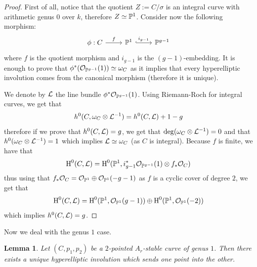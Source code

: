 \documentclass{alggeom}
\numberwithin{equation}{section}
\numberwithin{subsection}{section}
\newtheorem{lemma}[theorem]{Lemma}
\theoremstyle{definition}
\theoremstyle{remark}
\newcommand\cO{\mathcal{O}} \newcommand\cP{\mathcal{P}}
\renewcommand\H{\operatorname{H}}
\begin{document}
\begin{proof}
First of all, notice that the quotient $Z:=C/\sigma$ is an integral curve with arithmetic genus $0$ over $k$, therefore $Z\simeq \mathbb{P}^1$. Consider now the following morphism:
$$ 
\begin{tikzcd}
\phi: C \arrow[r, "f"] & \PP^1 \arrow[r, "i_{g-1}", hook] & \PP^{g-1}
\end{tikzcd}
$$ 
where $f$ is the quotient morphism and $i_{g-1}$ is the $(g-1)$-embedding. It is enough to prove that $\phi^*(\cO_{\PP^{g-1}}(1)) \simeq \omega_C$ as it implies that every hyperelliptic involution comes from the canonical morphism (therefore it is unique).

We denote by $\mathcal{L}$ the line bundle $\phi^*\cO_{\PP^{g-1}}(1)$. Using Riemann-Roch for integral curves, we get that 
$$ h^0(C,\omega_C \otimes \mathcal{L}^{-1})= h^0(C,\mathcal{L}) + 1 -g $$ 
therefore if we prove that $h^0(C,\mathcal{L})= g$, we get that $\deg (\omega_C \otimes \mathcal{L}^{-1})=0$ and that $h^0(\omega_C \otimes \mathcal{L}^{-1})=1$ which implies $\mathcal{L} \simeq \omega_C$ (as $C$ is integral). Because $f$ is finite, we have that $$\H^0(C,\cL)=\H^0(\PP^1,i_{g-1}^*\cO_{\PP^{g-1}}(1) \otimes f_*\cO_C) $$
thus using that $f_*\cO_C= \cO_{\PP^1}\oplus \cO_{\PP^1}(-g-1)$ as $f$ is a cyclic cover of degree $2$, we get that 
$$ \H^0(C,\cL)= \H^0(\PP^1, \cO_{\PP^1}(g-1))\oplus \H^0(\PP^1, \cO_{\PP^1}(-2))$$
which implies $h^0(C,\mathcal{L})=g$. 
\end{proof}

Now we deal with the genus $1$ case.
\begin{lemma}\label{lem:genus1}
	Let $(C,p_1,p_2)$ be a $2$-pointed $A_r$-stable curve of genus $1$. Then there exists a unique hyperelliptic involution which sends one point into the other. 
\end{lemma}
\end{document}
